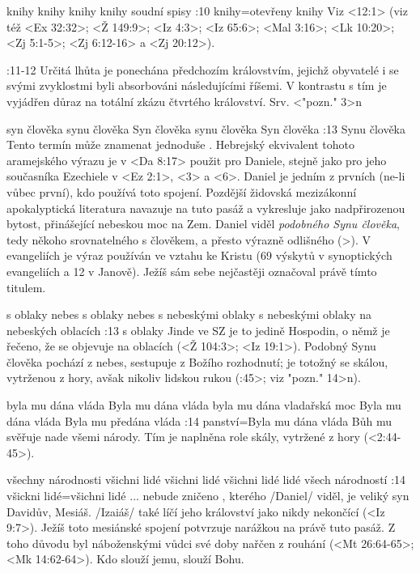     {knihy} %
    {knihy}  %
    {knihy} %
    {knihy}  %
    {soudní spisy}  %
:10 {knihy}={otevřeny knihy} Viz  <12:1> (viz též <Ex 32:32>; <Ž 149:9>; <Iz 4:3>; <Iz 65:6>;  <Mal 3:16>; <Lk 10:20>; <Zj 5:1-5>; <Zj 6:12-16> a <Zj 20:12>).

:11-12 {}  Určitá lhůta je ponechána předchozím královstvím, jejichž obyvatelé i se svými zvyklostmi byli absorbováni následujícími říšemi. V kontrastu s tím je vyjádřen důraz na totální zkázu čtvrtého království. Srv. <"pozn." 3>n

   {syn člověka}   %
   {synu člověka}   %
   {Syn člověka}   %
   {synu člověka}   %
   {Syn člověka}   %
:13 {Synu člověka} Tento termín může znamenat jednoduše . Hebrejský
   ekvivalent tohoto aramejského výrazu je v <Da 8:17>  použit pro Daniele, stejně jako pro jeho současníka    Ezechiele v <Ez 2:1>, <3> a <6>. 
   Daniel je jedním z prvních (ne-li  vůbec první), kdo používá toto spojení.  Pozdější židovská mezizákonní apokalyptická
   literatura navazuje na tuto pasáž a vykresluje  jako nadpřirozenou bytost,
   přinášející nebeskou moc na Zem. Daniel viděl {\em podobného Synu člověka}, tedy někoho srovnatelného s člověkem, a přesto výrazně odlišného (>). V evangeliích  je výraz  používán ve vztahu ke Kristu (69 výskytů v synoptických evangeliích a 12 v Janově). Ježíš sám sebe nejčastěji označoval právě tímto titulem.

    {s oblaky nebes} %
    {s oblaky nebes}  %
    {s nebeskými oblaky} %
    {s nebeskými oblaky}  %
    {na nebeských oblacích}  %
:13 {s oblaky} Jinde ve SZ je to jedině Hospodin, o němž je řečeno, že se objevuje na oblacích  (<Ž 104:3>; <Iz 19:1>). Podobný Synu člověka pochází z nebes, sestupuje z Božího rozhodnutí; je totožný se skálou, vytrženou z hory, avšak nikoliv lidskou rukou  (:45>; viz \<"pozn." 14>n).

   {byla mu dána vláda}   %
   {Byla mu dána vláda}   %
   {byla mu dána vladařská moc}   %
   {Byla mu dána vláda}   %
   {Byla mu předána vláda}   %
:14 {panství}={Byla mu dána vláda} Bůh mu svěřuje  nade všemi národy. Tím je naplněna role skály, vytržené z hory (<2:44-45>).

   {všechny národnosti}   %
   {všichni lidé}   %
   {všichni lidé}   %
   {všichni lidé}   %
   {lidé všech národností}   %
:14 {všickni lidé}={všichni lidé ... nebude zničeno} , kterého \x/Daniel/ viděl, je veliký syn Davidův, Mesiáš. \x/Izaiáš/ také líčí jeho království jako nikdy nekončící  (<Iz 9:7>). Ježíš toto mesiánské spojení potvrzuje narážkou na právě tuto pasáž. Z toho důvodu byl náboženskými vůdci své doby nařčen z rouhání (<Mt 26:64-65>; <Mk 14:62-64>). Kdo slouží jemu, slouží Bohu.

